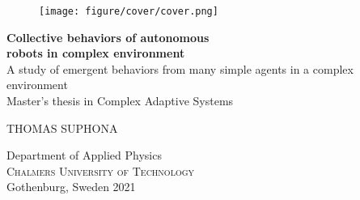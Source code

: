
\begin{titlepage}
			
\addtolength{\voffset}{2cm}

\begin{figure}[H]
\centering
\texttt{[image: figure/cover/cover.png]}
\end{figure}

\mbox{}
\renewcommand{\familydefault}{\sfdefault} \normalfont %
\textbf{{\Huge 	Collective behaviors of autonomous \\[0.2cm] 
				robots in complex environment }} 	\\[0.5cm]
{\Large A study of emergent behaviors from many simple agents in a complex environment}\\[0.5cm]
Master's thesis in Complex Adaptive Systems \setlength{\parskip}{1cm}

{\Large THOMAS SUPHONA} \setlength{\parskip}{2.9cm}

Department of Applied Physics \\
\textsc{Chalmers University of Technology} \\
Gothenburg, Sweden 2021

\renewcommand{\familydefault}{\rmdefault} \normalfont %
\end{titlepage}


\newpage
\restoregeometry
\thispagestyle{empty}
\mbox{}


